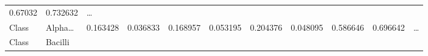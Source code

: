 \documentclass[
]{article}
\begin{document}
\begin{longtable}[]{@{}lllllllllll@{}}
\begin{minipage}[t]{0.06\columnwidth}
0.67032\strut
\end{minipage} & \begin{minipage}[t]{0.06\columnwidth}\raggedright
0.732632\strut
\end{minipage} & \begin{minipage}[t]{0.03\columnwidth}\raggedright
\ldots{}\strut
\end{minipage}\tabularnewline
\begin{minipage}[t]{0.06\columnwidth}\raggedright
Class\strut
\end{minipage} & \begin{minipage}[t]{0.06\columnwidth}\raggedright
Alpha\ldots{}\strut
\end{minipage} & \begin{minipage}[t]{0.09\columnwidth}\raggedright
0.163428\strut
\end{minipage} & \begin{minipage}[t]{0.06\columnwidth}\raggedright
0.036833\strut
\end{minipage} & \begin{minipage}[t]{0.09\columnwidth}\raggedright
0.168957\strut
\end{minipage} & \begin{minipage}[t]{0.06\columnwidth}\raggedright
0.053195\strut
\end{minipage} & \begin{minipage}[t]{0.09\columnwidth}\raggedright
0.204376\strut
\end{minipage} & \begin{minipage}[t]{0.06\columnwidth}\raggedright
0.048095\strut
\end{minipage} & \begin{minipage}[t]{0.06\columnwidth}\raggedright
0.586646\strut
\end{minipage} & \begin{minipage}[t]{0.06\columnwidth}\raggedright
0.696642\strut
\end{minipage} & \begin{minipage}[t]{0.03\columnwidth}\raggedright
\ldots{}\strut
\end{minipage}\tabularnewline
\begin{minipage}[t]{0.06\columnwidth}\raggedright
Class\strut
\end{minipage} & \begin{minipage}[t]{0.06\columnwidth}\raggedright
Bacilli\strut
\end{minipage} & \begin{minipage}[t]{0.09\columnwidth}\raggedright

\end{minipage}
\end{longtable}
\end{document}
